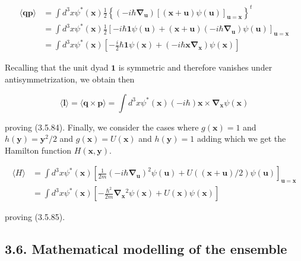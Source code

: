 \documentclass{article}
\begin{document}
\begin{align*}
\langle\boldsymbol{q} \boldsymbol{p}\rangle & =\int d^{3} x \psi^{*}(\boldsymbol{x}) \frac{1}{2}\left\{\left(-i \hbar \boldsymbol{\nabla}_{\boldsymbol{u}}\right)[(\boldsymbol{x}+\boldsymbol{u}) \psi(\boldsymbol{u})]_{\boldsymbol{u}=\boldsymbol{x}}\right\}^{t}  \tag{3.5.92}\\
& =\int d^{3} x \psi^{*}(\boldsymbol{x}) \frac{1}{2}\left[-i \hbar \mathbf{1} \psi(\boldsymbol{u})+(\boldsymbol{x}+\boldsymbol{u})\left(-i \hbar \boldsymbol{\nabla}_{\boldsymbol{u}}\right) \psi(\boldsymbol{u})\right]_{\boldsymbol{u}=\boldsymbol{x}} \\
& =\int d^{3} x \psi^{*}(\boldsymbol{x})\left[-\frac{i}{2} \hbar \mathbf{1} \psi(\boldsymbol{x})+\left(-i \hbar \boldsymbol{x} \boldsymbol{\nabla}_{\boldsymbol{x}}\right) \psi(\boldsymbol{x})\right]
\end{align*}
 

Recalling that the unit dyad $\mathbf{1}$ is symmetric and therefore vanishes under antisymmetrization, we obtain then
 
\begin{equation*}
\langle\boldsymbol{l}\rangle=\langle\boldsymbol{q} \times \boldsymbol{p}\rangle=\int d^{3} x \psi^{*}(\boldsymbol{x})(-i \hbar) \boldsymbol{x} \times \boldsymbol{\nabla}_{\boldsymbol{x}} \psi(\boldsymbol{x}) \tag{3.5.93}
\end{equation*}
 
proving (3.5.84). Finally, we consider the cases where $g(\boldsymbol{x})=1$ and $h(\boldsymbol{y})=\boldsymbol{y}^{2} / 2$ and $g(\boldsymbol{x})=U(\boldsymbol{x})$ and $h(\boldsymbol{y})=1$ adding which we get the Hamilton function $H(\boldsymbol{x}, \boldsymbol{y})$.
 
\begin{align*}
\langle H\rangle & =\int d^{3} x \psi^{*}(\boldsymbol{x})\left[\frac{1}{2 m}\left(-i \hbar \boldsymbol{\nabla}_{\boldsymbol{u}}\right)^{2} \psi(\boldsymbol{u})+U((\boldsymbol{x}+\boldsymbol{u}) / 2) \psi(\boldsymbol{u})\right]_{\boldsymbol{u}=\boldsymbol{x}}  \tag{3.5.94}\\
& =\int d^{3} x \psi^{*}(\boldsymbol{x})\left[-\frac{\hbar^{2}}{2 m} \boldsymbol{\nabla}_{\boldsymbol{x}}{ }^{2} \psi(\boldsymbol{x})+U(\boldsymbol{x}) \psi(\boldsymbol{x})\right]
\end{align*}
 
proving (3.5.85).

\subsection*{3.6. Mathematical modelling of the ensemble}
\end{document}
